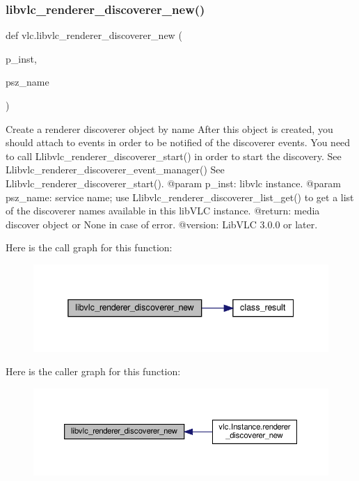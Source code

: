\subsubsection{\texorpdfstring{libvlc\+\_\+renderer\+\_\+discoverer\+\_\+new()}{libvlc\_renderer\_discoverer\_new()}}
{\footnotesize\ttfamily def vlc.\+libvlc\+\_\+renderer\+\_\+discoverer\+\_\+new (\begin{DoxyParamCaption}\item[{}]{p\+\_\+inst,  }\item[{}]{psz\+\_\+name }\end{DoxyParamCaption})}

\begin{DoxyVerb}Create a renderer discoverer object by name
After this object is created, you should attach to events in order to be
notified of the discoverer events.
You need to call L{libvlc_renderer_discoverer_start}() in order to start the
discovery.
See L{libvlc_renderer_discoverer_event_manager}()
See L{libvlc_renderer_discoverer_start}().
@param p_inst: libvlc instance.
@param psz_name: service name; use L{libvlc_renderer_discoverer_list_get}() to get a list of the discoverer names available in this libVLC instance.
@return: media discover object or None in case of error.
@version: LibVLC 3.0.0 or later.
\end{DoxyVerb}
 Here is the call graph for this function\+:
\nopagebreak
\begin{figure}[H]
\begin{center}
\leavevmode
\includegraphics[width=338pt]{namespacevlc_a3f696d66405b9f0cf8d2c6932f763cfa_cgraph}
\end{center}
\end{figure}
Here is the caller graph for this function\+:
\nopagebreak
\begin{figure}[H]
\begin{center}
\leavevmode
\includegraphics[width=350pt]{namespacevlc_a3f696d66405b9f0cf8d2c6932f763cfa_icgraph}
\end{center}
\end{figure}
\mbox{\label{namespacevlc_a81262d81bc9835dc7bdaea45c9d20b06}} 
